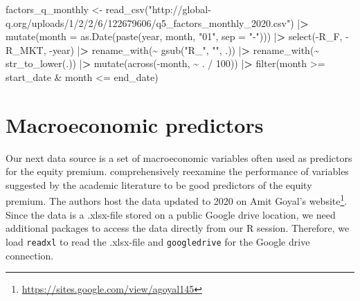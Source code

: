 \documentclass[
]{book}
\newenvironment{Shaded}{\begin{snugshade}}{\end{snugshade}}
\newcommand{\AttributeTok}[1]{\textcolor[rgb]{0.61,0.61,0.61}{#1}}
\newcommand{\DecValTok}[1]{\textcolor[rgb]{0.06,0.06,0.06}{#1}}
\newcommand{\ErrorTok}[1]{\textcolor[rgb]{0.14,0.14,0.14}{\textbf{#1}}}
\newcommand{\FunctionTok}[1]{\textcolor[rgb]{0,0,0}{#1}}
\newcommand{\NormalTok}[1]{#1}
\newcommand{\OtherTok}[1]{\textcolor[rgb]{0.37,0.37,0.37}{#1}}
\newcommand{\SpecialCharTok}[1]{\textcolor[rgb]{0,0,0}{#1}}
\newcommand{\StringTok}[1]{\textcolor[rgb]{0.5,0.5,0.5}{#1}}
\renewcommand{\href}[2]{#2\footnote{\url{#1}}}
\begin{document}
\begin{Shaded}
\begin{Highlighting}[]
\NormalTok{factors\_q\_monthly }\OtherTok{\textless{}{-}} \FunctionTok{read\_csv}\NormalTok{(}\StringTok{"http://global{-}q.org/uploads/1/2/2/6/122679606/q5\_factors\_monthly\_2020.csv"}\NormalTok{) }\SpecialCharTok{|}\ErrorTok{\textgreater{}}
  \FunctionTok{mutate}\NormalTok{(}\AttributeTok{month =} \FunctionTok{as.Date}\NormalTok{(}\FunctionTok{paste}\NormalTok{(year, month, }\StringTok{"01"}\NormalTok{, }\AttributeTok{sep =} \StringTok{"{-}"}\NormalTok{))) }\SpecialCharTok{|}\ErrorTok{\textgreater{}}
  \FunctionTok{select}\NormalTok{(}\SpecialCharTok{{-}}\NormalTok{R\_F, }\SpecialCharTok{{-}}\NormalTok{R\_MKT, }\SpecialCharTok{{-}}\NormalTok{year) }\SpecialCharTok{|}\ErrorTok{\textgreater{}}
  \FunctionTok{rename\_with}\NormalTok{(}\SpecialCharTok{\textasciitilde{}} \FunctionTok{gsub}\NormalTok{(}\StringTok{"R\_"}\NormalTok{, }\StringTok{""}\NormalTok{, .)) }\SpecialCharTok{|}\ErrorTok{\textgreater{}}
  \FunctionTok{rename\_with}\NormalTok{(}\SpecialCharTok{\textasciitilde{}} \FunctionTok{str\_to\_lower}\NormalTok{(.)) }\SpecialCharTok{|}\ErrorTok{\textgreater{}}
  \FunctionTok{mutate}\NormalTok{(}\FunctionTok{across}\NormalTok{(}\SpecialCharTok{{-}}\NormalTok{month, }\SpecialCharTok{\textasciitilde{}}\NormalTok{ . }\SpecialCharTok{/} \DecValTok{100}\NormalTok{)) }\SpecialCharTok{|}\ErrorTok{\textgreater{}}
  \FunctionTok{filter}\NormalTok{(month }\SpecialCharTok{\textgreater{}=}\NormalTok{ start\_date }\SpecialCharTok{\&}\NormalTok{ month }\SpecialCharTok{\textless{}=}\NormalTok{ end\_date)}
\end{Highlighting}
\end{Shaded}

\hypertarget{macroeconomic-predictors}{%
\section{Macroeconomic predictors}\label{macroeconomic-predictors}}

Our next data source is a set of macroeconomic variables often used as predictors for the equity premium. \citet{Goyal2008} comprehensively reexamine the performance of variables suggested by the academic literature to be good predictors of the equity premium. The authors host the data updated to 2020 on \href{https://sites.google.com/view/agoyal145}{Amit Goyal's website}. Since the data is a .xlsx-file stored on a public Google drive location, we need additional packages to access the data directly from our R session. Therefore, we load \texttt{readxl} to read the .xlsx-file and \texttt{googledrive} for the Google drive connection.
\end{document}
